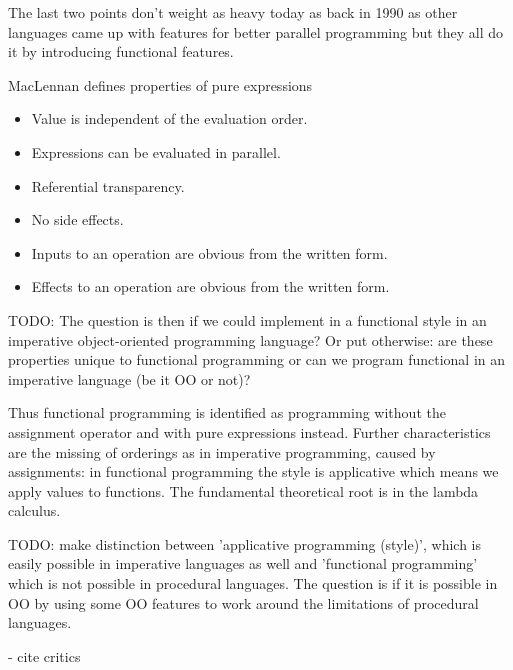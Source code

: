The last two points don't weight as heavy today as back in 1990 as other languages came up with features for better parallel programming but they all do it by introducing functional features.

MacLennan \cite{maclennan_functional_1990} defines properties of pure expressions 
\begin{itemize}
	\item Value is independent of the evaluation order.
	\item Expressions can be evaluated in parallel.
	\item Referential transparency.
	\item No side effects.
	\item Inputs to an operation are obvious from the written form.
	\item Effects to an operation are obvious from the written form.
\end{itemize}

TODO: The question is then if we could implement in a functional style in an imperative object-oriented programming language? Or put otherwise: are these properties unique to functional programming or can we program functional in an imperative language (be it OO or not)?

Thus functional programming is identified as programming without the assignment operator and with pure expressions instead. Further characteristics are the missing of orderings as in imperative programming, caused by assignments: in functional programming the style is applicative which means we apply values to functions. The fundamental theoretical root is in the lambda calculus.

TODO: make distinction between 'applicative programming (style)', which is easily possible in imperative languages as well and 'functional programming' which is not possible in procedural languages. The question is if it is possible in OO by using some OO features to work around the limitations of procedural languages.

- cite critics